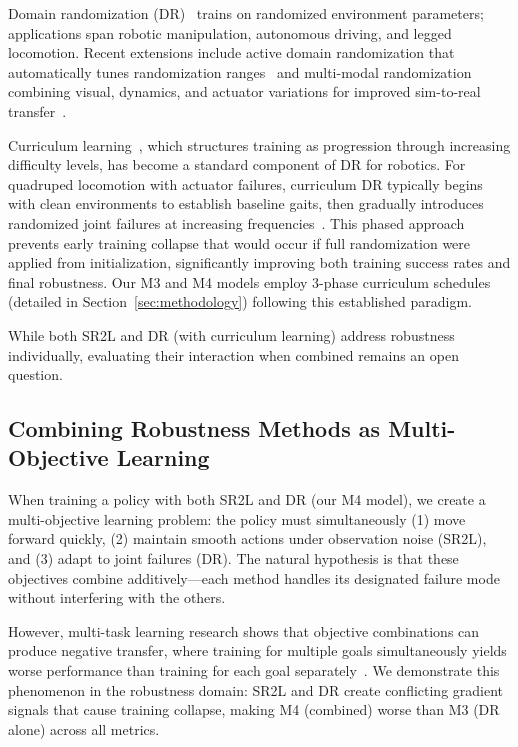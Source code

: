 \documentclass[conference]{IEEEtran}
\begin{document}
Domain randomization (DR)~\cite{tobin2017domain,peng2018sim} trains on randomized environment parameters; applications span robotic manipulation, autonomous driving, and legged locomotion. Recent extensions include active domain randomization that automatically tunes randomization ranges~\cite{mehta2020active} and multi-modal randomization combining visual, dynamics, and actuator variations for improved sim-to-real transfer~\cite{openai2019solving}.

Curriculum learning~\cite{bengio2009curriculum}, which structures training as progression through increasing difficulty levels, has become a standard component of DR for robotics. For quadruped locomotion with actuator failures, curriculum DR typically begins with clean environments to establish baseline gaits, then gradually introduces randomized joint failures at increasing frequencies~\cite{muratore2022robot}. This phased approach prevents early training collapse that would occur if full randomization were applied from initialization, significantly improving both training success rates and final robustness. Our M3 and M4 models employ 3-phase curriculum schedules (detailed in Section~\ref{sec:methodology}) following this established paradigm.

While both SR2L and DR (with curriculum learning) address robustness individually, evaluating their interaction when combined remains an open question.

\subsection{Combining Robustness Methods as Multi-Objective Learning}

When training a policy with both SR2L and DR (our M4 model), we create a multi-objective learning problem: the policy must simultaneously (1) move forward quickly, (2) maintain smooth actions under observation noise (SR2L), and (3) adapt to joint failures (DR). The natural hypothesis is that these objectives combine additively—each method handles its designated failure mode without interfering with the others.

However, multi-task learning research shows that objective combinations can produce negative transfer, where training for multiple goals simultaneously yields worse performance than training for each goal separately~\cite{standley2020tasks}. We demonstrate this phenomenon in the robustness domain: SR2L and DR create conflicting gradient signals that cause training collapse, making M4 (combined) worse than M3 (DR alone) across all metrics.
\end{document}
